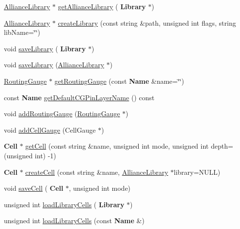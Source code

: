 \begin{DoxyCompactItemize}
\hyperlink{classCRL_1_1AllianceLibrary}{Alliance\+Library} $\ast$ \hyperlink{classCRL_1_1AllianceFramework_a8e007b3f2ac45feec2907f77530a718c}{get\+Alliance\+Library} (\textbf{ Library} $\ast$)
\item 
\hyperlink{classCRL_1_1AllianceLibrary}{Alliance\+Library} $\ast$ \hyperlink{classCRL_1_1AllianceFramework_a4efc06e6a6d5413398946453c3fd6649}{create\+Library} (const string \&path, unsigned int flags, string lib\+Name=\char`\"{}\char`\"{})
\item 
void \hyperlink{classCRL_1_1AllianceFramework_a5e5a3d137a2c141bf8984877b7f7d18a}{save\+Library} (\textbf{ Library} $\ast$)
\item 
void \hyperlink{classCRL_1_1AllianceFramework_afe7a103d54e865511fd55af90eddcf4e}{save\+Library} (\hyperlink{classCRL_1_1AllianceLibrary}{Alliance\+Library} $\ast$)
\item 
\hyperlink{classCRL_1_1RoutingGauge}{Routing\+Gauge} $\ast$ \hyperlink{classCRL_1_1AllianceFramework_ae102d655820c5d0a29a0200c5e83d42c}{get\+Routing\+Gauge} (const \textbf{ Name} \&name=\char`\"{}\char`\"{})
\item 
const \textbf{ Name} \hyperlink{classCRL_1_1AllianceFramework_ae2bf20fc92a4684bebdab666c68c8aab}{get\+Default\+C\+G\+Pin\+Layer\+Name} () const
\item 
void \hyperlink{classCRL_1_1AllianceFramework_ae182fd150c695fd24c1b10ddbc377b32}{add\+Routing\+Gauge} (\hyperlink{classCRL_1_1RoutingGauge}{Routing\+Gauge} $\ast$)
\item 
void \hyperlink{classCRL_1_1AllianceFramework_aab16db33a0ce2e3bce5739f7cadb3d5a}{add\+Cell\+Gauge} (Cell\+Gauge $\ast$)
\item 
\textbf{ Cell} $\ast$ \hyperlink{classCRL_1_1AllianceFramework_a329d04c188668968308108523d16e2be}{get\+Cell} (const string \&name, unsigned int mode, unsigned int depth=(unsigned int) -\/1)
\item 
\textbf{ Cell} $\ast$ \hyperlink{classCRL_1_1AllianceFramework_ac4381ad0c3799d584ef3ea160846e2bb}{create\+Cell} (const string \&name, \hyperlink{classCRL_1_1AllianceLibrary}{Alliance\+Library} $\ast$library=N\+U\+LL)
\item 
void \hyperlink{classCRL_1_1AllianceFramework_abb34a606c7cd21638b4439701a8dcef9}{save\+Cell} (\textbf{ Cell} $\ast$, unsigned int mode)
\item 
unsigned int \hyperlink{classCRL_1_1AllianceFramework_a2e43b1928a05eea4b2dc1fe0757e4865}{load\+Library\+Cells} (\textbf{ Library} $\ast$)
\item 
unsigned int \hyperlink{classCRL_1_1AllianceFramework_adc8acedeb9daa37b4ab2dee0717835fa}{load\+Library\+Cells} (const \textbf{ Name} \&)
\end{DoxyCompactItemize}
